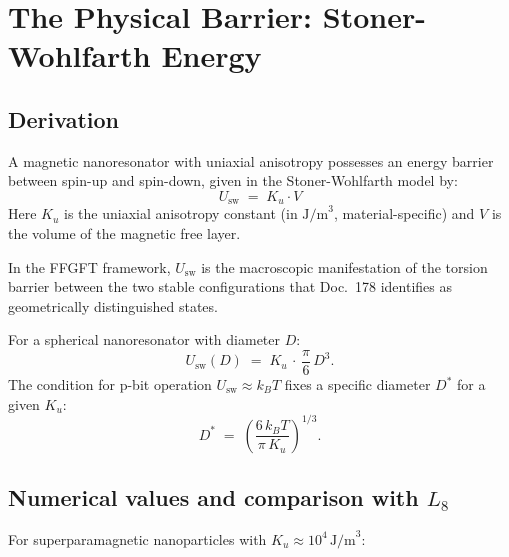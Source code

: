 	\section{The Physical Barrier: Stoner-Wohlfarth Energy}
	\label{sec:stoner-wohlfarth}
	
	\subsection{Derivation}
	\label{subsec:sw-derivation}
	
	A magnetic nanoresonator with uniaxial anisotropy possesses an
	energy barrier between spin-up and spin-down, given in the
	Stoner-Wohlfarth model \cite{Stoner1948} by:
	\begin{equation}
		U_\text{sw} \;=\; K_u \cdot V
		\label{eq:stoner-wohlfarth}
	\end{equation}
	Here $K_u$ is the uniaxial anisotropy constant
	(in $\text{J/m}^3$, material-specific) and $V$ is the volume of the
	magnetic free layer.
	
	In the FFGFT framework, $U_\text{sw}$ is the macroscopic manifestation
	of the torsion barrier between the two stable configurations
	that Doc.~178 identifies as geometrically distinguished states.
	
	For a spherical nanoresonator with diameter $D$:
	\begin{equation}
		U_\text{sw}(D) \;=\; K_u\,\cdot\,\frac{\pi}{6}\,D^3.
		\label{eq:barrier-geometric}
	\end{equation}
	The condition for p-bit operation $U_\text{sw} \approx k_B T$ fixes
	a specific diameter $D^*$ for a given $K_u$:
	\begin{equation}
		D^* \;=\; \left(\frac{6\,k_B T}{\pi\,K_u}\right)^{1/3}.
		\label{eq:d-star}
	\end{equation}
	
	\subsection{Numerical values and comparison with \texorpdfstring{$L_8$}{L8}}
	\label{subsec:pbit-regime}
	
	For superparamagnetic nanoparticles with
	$K_u \approx 10^4\,\text{J/m}^3$:
	
